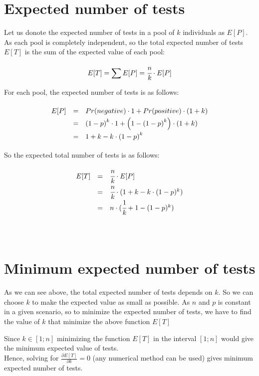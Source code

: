 \section{Expected number of tests}

Let us donote the expected number of tests in a pool of $k$ individuals as $E[P]$. As each pool is completely independent, so the total expected number of tests $E[T]$ is the sum of the expected value of each pool:

\[
  E[T] = \sum E[P] = \cfrac{n}{k} \cdot E[P]
\]

For each pool, the expected number of tests is as follows:

\[\def\arraystretch{1.5}
  \begin{array}{l l l}
        E[P] & = & Pr(negative) \cdot 1 + Pr(positive) \cdot (1 + k) \\
             & = & \left(1 - p\right)^k \cdot 1 + \left(1 - \left(1 - p \right)^k \right) \cdot \left(1 + k \right) \\
             & = & 1 + k - k \cdot \left(1 - p \right)^k
  \end{array}
\]

So the expected total number of tests is as follows:

\[\def\arraystretch{1.5}
  \begin{array}{l l l}
        E[T] & = & \cfrac{n}{k} \cdot E[P] \\
             & = & \cfrac{n}{k} \cdot ( 1 + k - k \cdot (1 - p )^k) \\
             & = & n \cdot ( \cfrac{1}{k} + 1 - (1 - p)^k )
  \end{array}
\]\\\\

\section{Minimum expected number of tests}

As we can see above, the total expected number of tests depends on $k$. So we can choose $k$ to make the expected value as small as possible. As $n$ and $p$ is constant in a given scenario, so to minimize the expected number of tests, we have to find the value of $k$ that minimize the above function $E[T]$


Since $k \in [1 ; n]$ minimizing the function $E[T]$ in the interval $[1 ; n]$ would give the minimum expected value of tests. \\
Hence, solving for $\frac{\partial E[T]}{\partial k} = 0$ (any numerical method can be used) gives minimum expected number of tests. \\

